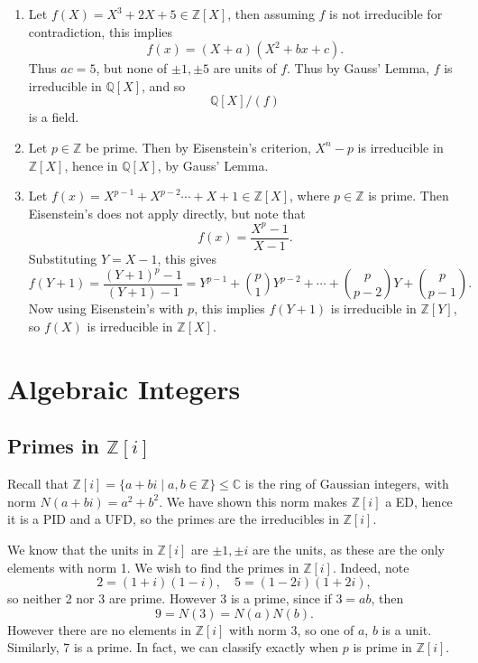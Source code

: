 \documentclass[12pt]{article}
\theoremstyle{definition}
\theoremstyle{remark}
\begin{document}
\begin{enumerate}[resume, label = (\roman*)]
	\item Let $f(X) = X^3 + 2X + 5 \in \mathbb{Z}[X]$, then assuming $f$ is not irreducible for contradiction, this implies
		\[
			f(x) = (X + a)(X^2 + bx + c)
		.\]
		Thus $ac = 5$, but none of $\pm 1, \pm 5$ are units of $f$. Thus by Gauss' Lemma, $f$ is irreducible in $\mathbb{Q}[X]$, and so
		\[
			\mathbb{Q}[X] / (f)
		\]
		is a field.
	\item Let $p \in \mathbb{Z}$ be prime. Then by Eisenstein's criterion, $X^{n} - p$ is irreducible in $\mathbb{Z}[X]$, hence in $\mathbb{Q}[X]$, by Gauss' Lemma.
	\item Let $f(x) = X^{p - 1} + X^{p - 2} \cdots + X + 1 \in \mathbb{Z}[X]$, where $p \in \mathbb{Z}$ is prime. Then Eisenstein's does not apply directly, but note that
		\[
			f(x) = \frac{X^{p} - 1}{X - 1}
		.\]
		Substituting $Y = X - 1$, this gives
		\[
			f(Y + 1) = \frac{(Y + 1)^{p} - 1}{(Y + 1) - 1} = Y^{p - 1} + \binom{p}{1} Y^{p - 2} + \cdots + \binom{p}{p-2} Y + \binom{p}{p-1}
		.\]
		Now using Eisenstein's with $p$, this implies $f(Y + 1)$ is irreducible in $\mathbb{Z}[Y]$, so $f(X)$ is irreducible in $\mathbb{Z}[X]$.
\end{enumerate}

\newpage

\section{Algebraic Integers}%
\label{sec:algebraic_integers}

\subsection{Primes in \texorpdfstring{$\mathbb{Z}[i]$}{Z[i]}}%
\label{sub:primes_in_z_i_}

Recall that $\mathbb{Z}[i] = \{a + bi \mid a, b \in \mathbb{Z}\} \leq \mathbb{C}$ is the ring of Gaussian integers, with norm $N(a + bi) = a^2 + b^2$. We have shown this norm makes $\mathbb{Z}[i]$ a ED, hence it is a PID and a UFD, so the primes are the irreducibles in $\mathbb{Z}[i]$.

We know that the units in $\mathbb{Z}[i]$ are $\pm 1, \pm i$ are the units, as these are the only elements with norm 1. We wish to find the primes in $\mathbb{Z}[i]$. Indeed, note
\[
	2 = (1 + i)(1 - i), \quad 5 = (1 - 2i)(1 + 2i)
,\]
so neither 2 nor 3 are prime. However 3 is a prime, since if $3 = ab$, then
\[
	9 = N(3) = N(a)N(b)
.\]
However there are no elements in $\mathbb{Z}[i]$ with norm 3, so one of $a$, $b$ is a unit. Similarly, 7 is a prime. In fact, we can classify exactly when $p$ is prime in $\mathbb{Z}[i]$.
\end{document}
